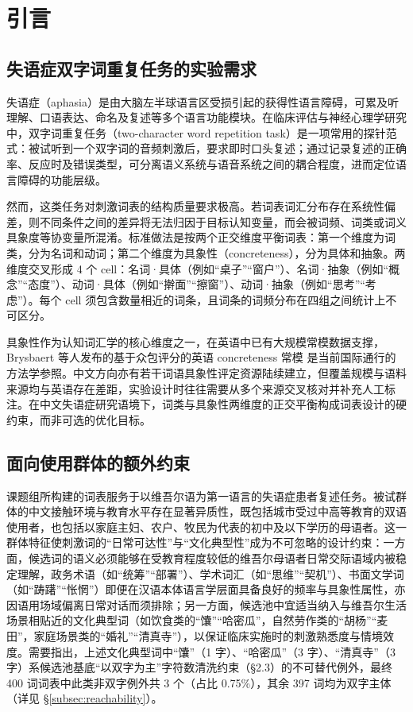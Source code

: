 \documentclass[12pt, a4paper]{article}
\begin{document}
\newpage

\section{引言}
\label{sec:intro}

\subsection{失语症双字词重复任务的实验需求}

失语症（aphasia）是由大脑左半球语言区受损引起的获得性语言障碍，可累及听理解、口语表达、命名及复述等多个语言功能模块。在临床评估与神经心理学研究中，双字词重复任务（two-character word repetition task）是一项常用的探针范式：被试听到一个双字词的音频刺激后，要求即时口头复述；通过记录复述的正确率、反应时及错误类型，可分离语义系统与语音系统之间的耦合程度，进而定位语言障碍的功能层级。

然而，这类任务对刺激词表的结构质量要求极高。若词表词汇分布存在系统性偏差，则不同条件之间的差异将无法归因于目标认知变量，而会被词频、词类或词义具象度等协变量所混淆。标准做法是按两个正交维度平衡词表：第一个维度为词类，分为名词和动词；第二个维度为具象性（concreteness），分为具体和抽象。两维度交叉形成 4 个 cell：名词·具体（例如“桌子”“窗户”）、名词·抽象（例如“概念”“态度”）、动词·具体（例如“擀面”“擦窗”）、动词·抽象（例如“思考”“考虑”）。每个 cell 须包含数量相近的词条，且词条的词频分布在四组之间统计上不可区分。

具象性作为认知词汇学的核心维度之一，在英语中已有大规模常模数据支撑，Brysbaert 等人发布的基于众包评分的英语 concreteness 常模 \cite{brysbaert2014concreteness} 是当前国际通行的方法学参照。中文方向亦有若干词语具象性评定资源陆续建立，但覆盖规模与语料来源均与英语存在差距，实验设计时往往需要从多个来源交叉核对并补充人工标注。在中文失语症研究语境下，词类与具象性两维度的正交平衡构成词表设计的硬约束，而非可选的优化目标。

\subsection{面向使用群体的额外约束}

课题组所构建的词表服务于以维吾尔语为第一语言的失语症患者复述任务。被试群体的中文接触环境与教育水平存在显著异质性，既包括城市受过中高等教育的双语使用者，也包括以家庭主妇、农户、牧民为代表的初中及以下学历的母语者。这一群体特征使刺激词的“日常可达性”与“文化典型性”成为不可忽略的设计约束：一方面，候选词的语义必须能够在受教育程度较低的维吾尔母语者日常交际语域内被稳定理解，政务术语（如“统筹”“部署”）、学术词汇（如“思维”“契机”）、书面文学词（如“踌躇”“怅惘”）即便在汉语本体语言学层面具备良好的频率与具象性属性，亦因语用场域偏离日常对话而须排除；另一方面，候选池中宜适当纳入与维吾尔生活场景相贴近的文化典型词（如饮食类的“馕”“哈密瓜”，自然劳作类的“胡杨”“麦田”，家庭场景类的“婚礼”“清真寺”），以保证临床实施时的刺激熟悉度与情境效度。需要指出，上述文化典型词中“馕”（1 字）、“哈密瓜”（3 字）、“清真寺”（3 字）系候选池基底“以双字为主”字符数清洗约束（\S 2.3）的不可替代例外，最终 400 词词表中此类非双字例外共 3 个（占比 0.75\%），其余 397 词均为双字主体（详见 \S\ref{subsec:reachability}）。
\end{document}

